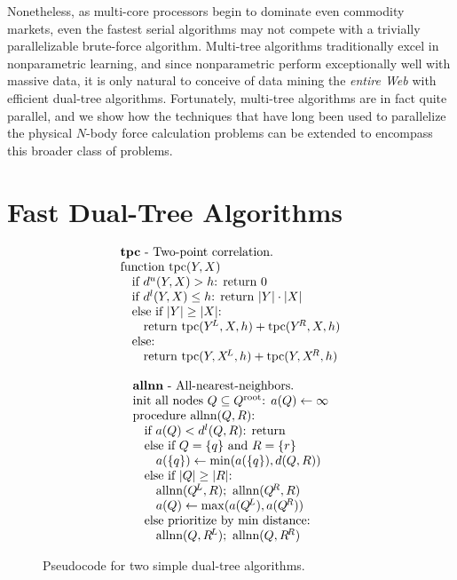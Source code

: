 \documentclass[times, leqno,twocolumn]{article}
\newcommand{\psty}{}
\newcommand{\X}{\\ \psty}
\newcommand{\x}{\X \hspace{0.13in}}
\newcommand{\xx}{\X \hspace{0.26in}}
\newcommand{\kdroot}[1]{#1^{\text{root}}}
\newcommand{\kdleft}[1]{#1^{\!L}}
\newcommand{\kdright}[1]{#1^{\!R}}
\newcommand{\lo}[1]{#1^{l}}
\newcommand{\up}[1]{#1^{u}}
\newcommand{\distlo}{\lo{d}}
\newcommand{\distup}{\up{d}}
\newcommand{\dist}[2]{d(#1,#2)}
\begin{document}
Nonetheless, as multi-core processors begin to dominate even commodity markets, even the fastest serial algorithms may not compete with a trivially parallelizable brute-force algorithm.
Multi-tree algorithms traditionally excel in nonparametric learning, and since nonparametric perform exceptionally well with massive data, it is only natural to conceive of data mining the {\it entire Web} with efficient dual-tree algorithms.
Fortunately, multi-tree algorithms are in fact quite parallel, and we show how the techniques that have long been used to parallelize the physical $N$-body force calculation problems can be extended to encompass this broader class of problems.

\section{Fast Dual-Tree Algorithms}

\begin{figure*}
  \begin{minipage}{6in}
    \begin{minipage}{2.5in}
      \begin{displaymath}
        \begin{array}[t]{l}
          \text{{\bf tpc} - Two-point correlation.}
          \X \text{function tpc}(Y, X)
          \x \text{if }\distup(Y, X) > h\text{: return }0
          \x \text{if }\distlo(Y, X) \leq h\text{: return } |Y| \cdot |X|
          \x \text{else if }|Y| \geq |X|\text{:}
          \xx \text{return tpc}(\kdleft{Y}, X, h) + \text{tpc}(\kdright{Y}, X, h)
          \x \text{else:}
          \xx \text{return tpc}(Y, \kdleft{X}, h) + \text{tpc}(Y, \kdright{X}, h)
        \end{array}
       \end{displaymath}
       \caption{\footnotesize \label{fig:allnntpc} Pseudocode for two simple dual-tree algorithms.}
      \end{minipage}
      \begin{minipage}{3.0in}
       \begin{displaymath}
        \begin{array}[t]{l}
          \text{{\bf allnn} - All-nearest-neighbors.}
          \X \text{init all nodes }Q \subseteq \kdroot{Q}\text{: }a(Q) \gets \infty
          \X \text{procedure allnn}(Q,R)\text{:}
          \x \text{if }a(Q) < \distlo(Q, R)\text{: return}
          \x \text{else if }Q = \{q\} \text{ and } R = \{r\}
          \xx a(\{q\}) \gets \min(a(\{q\}), \dist{Q}{R})
          \x \text{else if }|Q| \geq |R|\text{:}
          \xx \text{allnn}(\kdleft{Q}, R); \text{ allnn}(\kdright{Q}, R)
          \xx a(Q) \gets \max(a(\kdleft{Q}), a(\kdright{Q}))
          \x \text{else prioritize by min distance:}
          \xx \text{allnn}(Q, \kdleft{R}); \text{ allnn}(Q, \kdright{R})
        \end{array}
       \end{displaymath}
      \end{minipage}
  \end{minipage}
\end{figure*}
\end{document}
